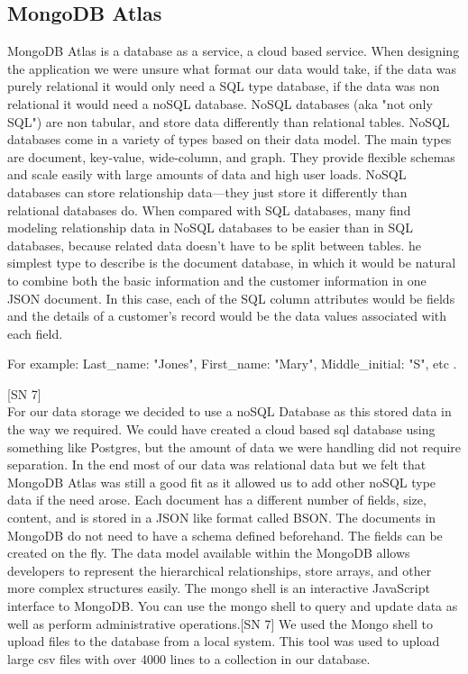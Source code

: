 \subsection{MongoDB Atlas}
MongoDB Atlas is a database as a service, a cloud based service.
When designing the application we were unsure what format our data would take, if the data was purely relational it would only need a SQL type database, if the data was non relational it would need a noSQL database. 
NoSQL databases (aka "not only SQL") are non tabular, and store data differently than relational tables. NoSQL databases come in a variety of types based on their data model. The main types are document, key-value, wide-column, and graph. They provide flexible schemas and scale easily with large amounts of data and high user loads.  NoSQL databases can store relationship data—they just store it differently than relational databases do. When compared with SQL databases, many find modeling relationship data in NoSQL databases to be easier than in SQL databases, because related data doesn’t have to be split between tables. he simplest type to describe is the document database, in which it would be natural to combine both the basic information and the customer information in one JSON document. In this case, each of the SQL column attributes would be fields and the details of a customer’s record would be the data values associated with each field.

For example: Last\_name: "Jones", First\_name: "Mary", Middle\_initial: "S", etc .


[SN 7] \\
For our data storage we decided to use a noSQL Database as this stored data in the way we required. We could have created a cloud based sql database using something like Postgres, but the amount of data we were handling did not require separation.
In the end most of our data was relational data but we felt that MongoDB Atlas was still a good fit as it allowed us to add other noSQL type data if the need arose. Each document has a different number of fields, size, content, and is stored in a JSON like format called BSON. The documents in MongoDB do not need to have a schema defined beforehand. The fields can be created on the fly. The data model available within the MongoDB allows developers to represent the hierarchical relationships, store arrays, and other more complex structures easily.
The mongo shell is an interactive JavaScript interface to MongoDB. You can use the mongo shell to query and update data as well as perform administrative operations.[SN 7] 
We used the Mongo shell to upload files to the database from a local system. This tool was used to upload large csv files  with over 4000 lines to a collection in our database.

